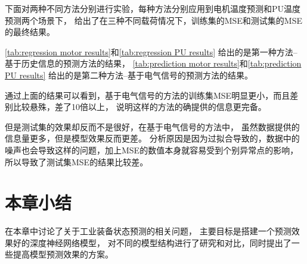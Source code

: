   下面对两种不同方法分别进行实验，每种方法分别应用到电机温度预测和PU温度预测两个场景下，
  给出了在三种不同载荷情况下，训练集的MSE和测试集的MSE的最终结果。

  
  \ref{tab:regression motor results}和\ref{tab:regression PU results}
  给出的是第一种方法--基于历史信息的预测方法的结果，
  \ref{tab:prediction motor results}和\ref{tab:prediction PU results}
  给出的是第二种方法--基于电气信号的预测方法的结果。

  通过上面的结果可以看到，基于电气信号的方法的训练集MSE明显更小，而且差别比较悬殊，差了10倍以上，
  说明这样的方法的确提供的信息更完备。

  但是测试集的效果却反而不是很好，在基于电气信号的方法中，
  虽然数据提供的信息量更多，但是模型效果反而更差。
  分析原因是因为过拟合导致的，数据中的噪声也会导致这样的问题，加上MSE的数值本身就容易受到个别异常点的影响，
  所以导致了测试集MSE的结果比较差。



\section{本章小结}
在本章中讨论了关于工业装备状态预测的相关问题，
主要目标是搭建一个预测效果好的深度神经网络模型，
对不同的模型结构进行了研究和对比，同时提出了一些提高模型预测效果的方案。
